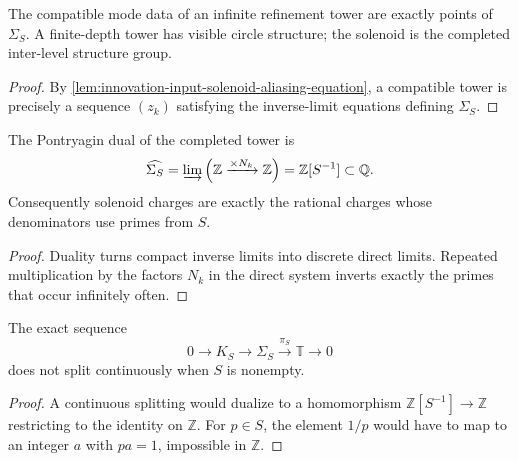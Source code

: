 \begin{theorem}
\label{thm:innovation-input-solenoid-tower-structure-group}
The compatible mode data of an infinite refinement tower are exactly
points of $\Sigma_S$. A finite-depth tower has visible circle structure;
the solenoid is the completed inter-level structure group.
\end{theorem}

\begin{proof}
By \autoref{lem:innovation-input-solenoid-aliasing-equation}, a compatible
tower is precisely a sequence $(z_k)$ satisfying the inverse-limit
equations defining $\Sigma_S$.
\end{proof}

\begin{theorem}
\label{thm:innovation-input-solenoid-charge-group}
The Pontryagin dual of the completed tower is
$$
\widehat{\Sigma_S}
=
\varinjlim
\left(
\mathbb Z\xrightarrow{\times N_k}\mathbb Z
\right)
=
\mathbb Z[S^{-1}]\subset\mathbb Q.
$$
Consequently solenoid charges are exactly the rational charges whose
denominators use primes from $S$.
\end{theorem}

\begin{proof}
Duality turns compact inverse limits into discrete direct limits. Repeated
multiplication by the factors $N_k$ in the direct system inverts exactly
the primes that occur infinitely often.
\end{proof}


\begin{theorem}
\label{thm:innovation-input-solenoid-no-splitting}
The exact sequence
$$
0\to K_S\to\Sigma_S\xrightarrow{\pi_S}\mathbb T\to0
$$
does not split continuously when $S$ is nonempty.
\end{theorem}

\begin{proof}
A continuous splitting would dualize to a homomorphism
$\mathbb Z[S^{-1}]\to\mathbb Z$ restricting to the identity on
$\mathbb Z$. For $p\in S$, the element $1/p$ would have to map to an
integer $a$ with $pa=1$, impossible in $\mathbb Z$.
\end{proof}

